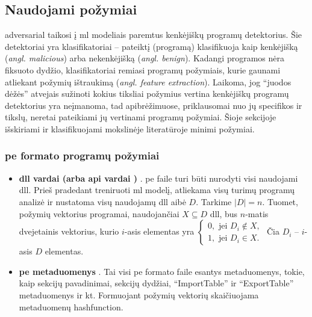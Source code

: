 \subsection{Naudojami požymiai}\label{sec:literature:features}
\Gls{adversarial} taikosi į \acs{ml} modeliais paremtus kenkėjiškų programų detektorius. Šie detektoriai yra klasifikatoriai -- pateiktį (programą) klasifikuoja kaip kenkėjišką (\textit{angl. malicious}) arba nekenkėjišką (\textit{angl. benign}). Kadangi programos nėra fiksuoto dydžio, klasifikatoriai remiasi programų požymiais, kurie gaunami atliekant požymių ištraukimą (\textit{angl. feature extraction}). Laikoma, jog \enquote{juodos dėžės} atvejais sužinoti kokius tiksliai požymius vertina kenkėjiškų programų detektorius yra neįmanoma, tad  apibrėžimuose, priklausomai nuo jų specifikos ir tikslų, neretai pateikiami jų vertinami programų požymiai. Šioje sekcijoje išskiriami ir klasifikuojami mokslinėje literatūroje minimi požymiai.

\subsubsection{\acs{pe} formato programų požymiai}\label{sec:literature:features:pe}
\begin{itemize}
    \item \textbf{\acs{dll} vardai (arba \acs{api} vardai \cite{huGeneratingAdversarialMalware2017})} \cite{zhongMalFoxCamouflagedAdversarial2024}. \acs{pe} faile turi būti nurodyti visi naudojami \acs{dll}. Prieš pradedant treniruoti \acs{ml} modelį, atliekama visų turimų programų analizė ir nustatoma visų naudojamų \acs{dll} aibė $D$. Tarkime $|D| = n$. Tuomet, požymių vektorius programai, naudojančiai $X \subseteq D$ \acs{dll}, bus $n$-matis dvejetainis vektorius, kurio $i$-asis elementas yra $\begin{cases}
        0, \text{ jei } D_i \not \in X, \\
        1, \text{ jei } D_i \in X.
    \end{cases}$ Čia $D_i$ -- $i$-asis $D$ elementas.
    \item \textbf{\acs{pe} metaduomenys} \cite{andersonLearningEvadeStatic2018}. Tai visi \acs{pe} formato faile esantys metaduomenys, tokie, kaip sekcijų pavadinimai, sekcijų dydžiai, \enquote{ImportTable} ir \enquote{ExportTable} metaduomenys ir kt. Formuojant požymių vektorių skaičiuojama metaduomenų \gls{hashfunction}.
\end{itemize}

